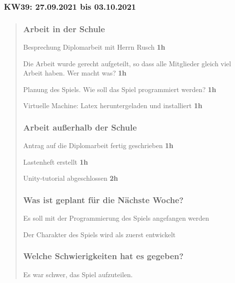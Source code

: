 

\subsubsection{KW39: 27.09.2021 bis 03.10.2021}
\begin{quote}
	\subsubsection*{Arbeit in der Schule}
	  Besprechung Diplomarbeit mit Herrn Rusch \textbf{1h}
	  
	  Die Arbeit wurde gerecht aufgeteilt, so dass alle Mitglieder gleich
	  viel Arbeit haben. Wer macht was? \textbf{1h}
	  
	  Planung des Spiels. Wie soll das Spiel programmiert werden?
	  \textbf{1h}
	  
	  Virtuelle Machine: Latex heruntergeladen und installiert \textbf{1h}
	  
	
	\subsubsection*{Arbeit außerhalb der Schule}
	  Antrag auf die Diplomarbeit fertig geschrieben \textbf{1h}
	  
	  Lastenheft erstellt \textbf{1h}
	  
	  Unity-tutorial abgeschlossen \textbf{2h}
	
	\subsubsection*{Was ist geplant für die Nächste Woche?} 
	
	  Es soll mit der Programmierung des Spiels angefangen werden
	
	    Der Charakter des Spiels wird als zuerst entwickelt
	
	\subsubsection*{Welche Schwierigkeiten hat es gegeben?} 
	
	  Es war schwer, das Spiel aufzuteilen.
\end{quote}
